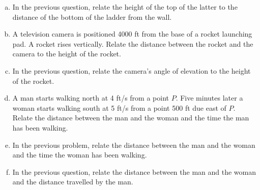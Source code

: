 \documentclass[12pt]{article}
\begin{document}
\begin{enumerate}[(a)]
\item
In the previous question, relate the height of the top of the latter to the distance of
the bottom of the ladder from the wall.

\item
A television camera is positioned 4000 ft from the base of a rocket launching
pad. A rocket rises vertically. Relate the distance between the rocket and the
camera to the height of the rocket.

\item
In the previous question, relate the camera's angle of elevation to the
height of the rocket.

\item
A man starts walking north at 4 ft/s from a point $P$. Five minutes
later a woman starts walking south at 5 ft/s from a point 500 ft due
east of $P$. Relate the distance between the man and the woman and
the time the man has been walking.

\item
In the previous problem, relate the distance between the man and the 
woman and the time the woman has been walking.

\item
In the previous question, relate the distance between the man and the
woman and the distance travelled by the man.

\end{enumerate}
\end{document}
